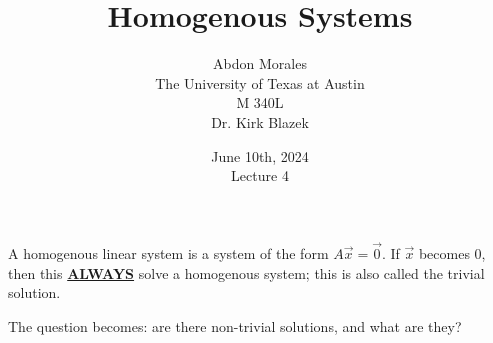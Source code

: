 \documentclass[11pt]{article} %
\title{Homogenous Systems}
\author{Abdon Morales \\ The University of Texas at Austin \\ M 340L \\ Dr. Kirk Blazek}
\date{June 10th, 2024 \\ Lecture 4}
\begin{document}
\maketitle
A homogenous linear system is a system of the form $A\vec{x}=\vec{0}$. If $\vec{x}$ becomes 0, then this \textbf{\underline{ALWAYS}} solve a homogenous system; 
this is also called the trivial solution.

The question becomes: are there non-trivial solutions, and what are they?



\end{document}
